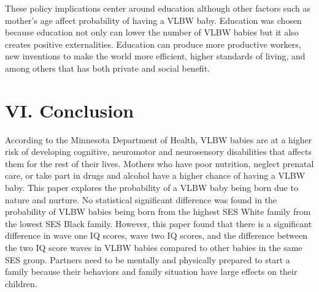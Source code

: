 \documentclass{article}
\begin{document}
These policy implications center around education although other factors such as mother's age affect probability of having a VLBW baby. Education was chosen because education not only can lower the number of VLBW babies but it also creates positive externalities. Education can produce more productive workers, new inventions to make the world more efficient, higher standards of living, and among others that has both private and social benefit.  


\nocite{hack2002outcomes}
\nocite{anderson2003neurobehavioral}
\nocite{hoynes2012income}
\nocite{hack1992effect}
\nocite{mccormick1992health}
\nocite{chapin2001won}

\section*{VI. Conclusion}

According to the Minnesota Department of Health, VLBW babies are at a higher risk of developing cognitive, neuromotor and neurosensory disabilities that affects them for the rest of their lives. Mothers who have poor nutrition, neglect prenatal care, or take part in drugs and alcohol have a higher chance of having a VLBW baby. This paper explores the probability of a VLBW baby being born due to nature and nurture. No statistical significant difference was found in the probability of VLBW babies being born from the highest SES White family from the lowest SES Black family. However, this paper found that there is a significant difference in wave one IQ scores, wave two IQ scores, and the difference between the two IQ score waves in VLBW babies compared to other babies in the same SES group. Partners need to be mentally and physically prepared to start a family because their behaviors and family situation have large effects on their children. 



\pagebreak

\singlespace


\noindent
\end{document}
